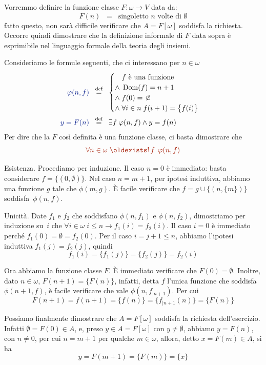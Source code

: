 \begin{soln}
	Vorremmo definire la funzione classe $F \colon \omega \to V$ data da:
	\[ F(n) \;\;=\;\; \text{singoletto $n$ volte di $\emptyset$}
		\]
	fatto questo, non sar\`a difficile verificare che $A = F[\omega]$ soddisfa la richiesta. Occorre quindi dimostrare che la definizione informale di $F$ data sopra \`e esprimibile nel linguaggio formale della teoria degli insiemi.

Consideriamo le formule seguenti, che ci interessano per $n\in\omega$
\begin{align*}
	{\drkblu \phi(n,f)} \;\;&\Mydef\;\; \begin{cases}
		\phantom{\land}\;\text{$f$ \`e una funzione} \\
		\land\; \Dom(f) = n+1 \\
		\land\; f(0) = \emptyset \\
		\land\; \forall {i \in n} \; f(i+1) =
\big\oldparen f(i)\big\} 
	\end{cases}\\
	{\drkblu y = F(n)} \;\;&\Mydef\;\; \exists f\;\phi(n,f)\land
y=f(n)
\end{align*}
Per dire che la $F$ cos\`i definita \`e una funzione classe, ci
basta dimostrare che
\[ {\drkred \forall{n\in\omega}\;\existsun f\;\phi(n,f)} \]

{\drkblu Esistenza.} Procediamo per induzione. Il caso $n = 0$ \`e
immediato: basta considerare $f = \{(0,\emptyset)\}$.
		Nel caso $n = m+1$, per ipotesi induttiva, abbiamo una
funzione $g$ tale che $\phi(m,g)$. \`E facile verificare che
$f=g\cup\{(n,\{m\})\}$ soddisfa~$\phi(n,f)$.

{\drkblu Unicit\`a.} Date $f_1$ e $f_2$ che soddisfano
$\phi(n,f_1)$ e $\phi(n,f_2)$, dimostriamo per induzione su~$i$ che
$\forall {i \in \omega} \; i \leq n \to f_1(i) = f_2(i)$. Il caso $i = 0$
\`e immediato perch\'e $f_1(0) = \emptyset = f_2(0)$. Per il caso $i =
j+1 \leq n$, abbiamo l'ipotesi induttiva $f_1(j)=f_2(j)$, quindi
\[f_1(i)
= \{f_1(j)\} = \{f_2(j)\} = f_2(i)\]

	Ora abbiamo la funzione classe $F$. \`E immediato verificare che
$F(0) = \emptyset$. Inoltre, dato $n \in \omega$, $F(n+1) = \{F(n)\}$,
infatti, detta $f$ l'unica funzione che soddisfa $\phi(n+1,f)$, \`e
facile verificare che vale $\phi(n,f_{|n+1})$. Per cui
	\[ F(n+1) = f(n+1) = \{f(n)\} = \{f_{|n+1}(n)\}= \{F(n)\}
		\]

Possiamo finalmente dimostrare che $A=F[\omega]$ soddisfa la richiesta
dell'esercizio. Infatti $\emptyset = F(0) \in A$, e, preso $y \in A = F[\omega]$
con $y\neq\emptyset$, abbiamo $y = F(n)$, con $n \ne 0$, per cui $n = m+1$
	per qualche $m \in \omega$, allora, detto $x = F(m) \in A$, si ha
\[y = F(m+1) = \{F(m)\} = \{x\}\]
\end{soln}


